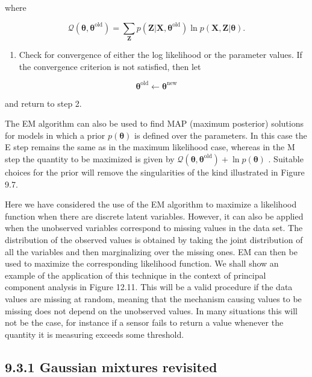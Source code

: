 \documentclass[
  10
]{article}
\providecommand{\tightlist}{%
  \setlength{\itemsep}{0pt}\setlength{\parskip}{0pt}}
\begin{document}
where

\[
\mathcal {Q} (\pmb {\theta}, \pmb {\theta} ^ {\mathrm{old}}) = \sum_ {\mathbf {Z}} p (\mathbf {Z} | \mathbf {X}, \pmb {\theta} ^ {\mathrm{old}}) \ln p (\mathbf {X}, \mathbf {Z} | \pmb {\theta}).\tag{9.33}
\]

\begin{enumerate}
\def\labelenumi{\arabic{enumi}.}
\setcounter{enumi}{3}
\tightlist
\item
  Check for convergence of either the log likelihood or the parameter
  values. If the convergence criterion is not satisfied, then let
\end{enumerate}

\[
\boldsymbol {\theta} ^ {\mathrm{old}} \leftarrow \boldsymbol {\theta} ^ {\mathrm{new}}\tag{9.34}
\]

and return to step 2.

The EM algorithm can also be used to find MAP (maximum posterior)
solutions for models in which a prior \(p ( \pmb \theta )\) is defined
over the parameters. In this case the E step remains the same as in the
maximum likelihood case, whereas in the M step the quantity to be
maximized is given by
\(\mathcal { Q } ( \pmb { \theta } , \pmb { \theta } ^ { \mathrm { o l d } } ) + \ln p ( \pmb { \theta } )\)
. Suitable choices for the prior will remove the singularities of the
kind illustrated in Figure 9.7.

Here we have considered the use of the EM algorithm to maximize a
likelihood function when there are discrete latent variables. However,
it can also be applied when the unobserved variables correspond to
missing values in the data set. The distribution of the observed values
is obtained by taking the joint distribution of all the variables and
then marginalizing over the missing ones. EM can then be used to
maximize the corresponding likelihood function. We shall show an example
of the application of this technique in the context of principal
component analysis in Figure 12.11. This will be a valid procedure if
the data values are missing at random, meaning that the mechanism
causing values to be missing does not depend on the unobserved values.
In many situations this will not be the case, for instance if a sensor
fails to return a value whenever the quantity it is measuring exceeds
some threshold.

\subsection{9.3.1 Gaussian mixtures
revisited}\label{gaussian-mixtures-revisited}
\end{document}
